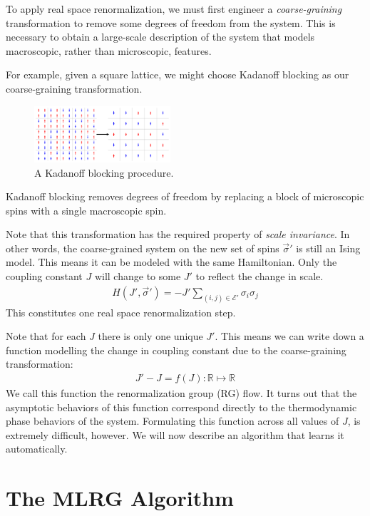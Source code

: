 \documentclass[%
    reprint,
    amsmath,amssymb,
    aps,
]{revtex4-2}
\begin{document}
To apply real space renormalization, we must first engineer a \textit{coarse-graining} transformation to remove some degrees of freedom from the system. 
This is necessary to obtain a large-scale description of the system that models macroscopic, rather than microscopic, features. 

For example, given a square lattice, we might choose Kadanoff blocking \cite{kadanoff-blocking} as our coarse-graining transformation. 
\begin{figure}[h]
    \includegraphics[width=0.45\textwidth]{tex/images/ising-blocking.png}
    \caption{\label{fig:kadanoff}
        A Kadanoff blocking procedure. 
    }
\end{figure}
Kadanoff blocking removes degrees of freedom by replacing a block of microscopic spins with a single macroscopic spin. 

Note that this transformation has the required property of \textit{scale invariance}. 
In other words, the coarse-grained system on the new set of spins $\vec{\sigma}'$ is still an Ising model. 
This means it can be modeled with the same Hamiltonian. 
Only the coupling constant $J$ will change to some $J'$ to reflect the change in scale. 
\begin{eqnarray}
    \label{eqn:ising-prime-hamiltonian}
    H(J', \vec{\sigma}') = -J' \sum_{(i, j) \in \mathcal{E'}} \sigma_i \sigma_j
\end{eqnarray}
This constitutes one real space renormalization step. 

Note that for each $J$ there is only one unique $J'$. 
This means we can write down a function modelling the change in coupling constant due to the coarse-graining transformation:
\begin{eqnarray}
    \label{eqn:rg-flow}
    J' - J = f(J) : \mathbb{R} \mapsto \mathbb{R}
\end{eqnarray}
We call this function the renormalization group (RG) flow. 
It turns out that the asymptotic behaviors of this function correspond directly to the thermodynamic phase behaviors of the system. 
Formulating this function across all values of $J$, is extremely difficult, however. 
We will now describe an algorithm that learns it automatically. 

\section{The MLRG Algorithm}
\end{document}
